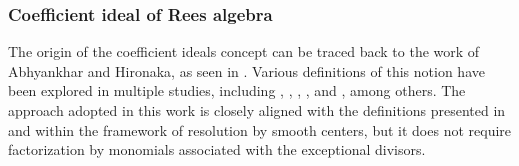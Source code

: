 \documentclass{amsart}
\newcommand{\cA}{{\mathcal A}}
\newcommand{\cI}{{\mathcal I}}
\newcommand{\cO}{{\mathcal O}}
\begin{document}
\subsubsection{Coefficient ideal of Rees algebra} The origin of the coefficient ideals concept can be traced back to the work of Abhyankhar and Hironaka, as seen in \cite{Hironaka}. Various definitions of this notion have been explored in multiple studies, including \cite{Villamayor}, \cite{Bierstone-Milman-simple}, \cite{Bierstone-Milman}, \cite{Wlodarczyk}, and \cite{Kollar}, among others. The approach adopted in this work is closely aligned with the definitions presented in \cite{Bierstone-Milman-simple} and \cite{Bierstone-Milman} within the framework of resolution by smooth centers, but it does not require factorization by monomials associated with the exceptional divisors.









\end{document}
